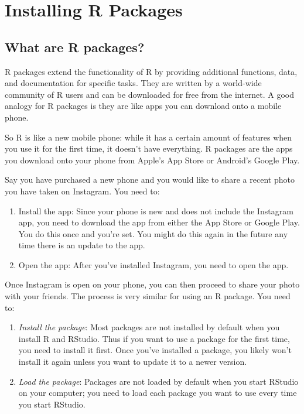 \documentclass[]{book}
\providecommand{\tightlist}{%
  \setlength{\itemsep}{0pt}\setlength{\parskip}{0pt}}
\begin{document}
\hypertarget{installing-r-packages}{%
\chapter{Installing R Packages}\label{installing-r-packages}}

\hypertarget{what-are-r-packages}{%
\section{What are R packages?}\label{what-are-r-packages}}

R packages extend the functionality of R by providing additional functions, data, and documentation for specific tasks. They are written by a world-wide community of R users and can be downloaded for free from the internet. A good analogy for R packages is they are like apps you can download onto a mobile phone.

So R is like a new mobile phone: while it has a certain amount of features when you use it for the first time, it doesn't have everything. R packages are the apps you download onto your phone from Apple's App Store or Android's Google Play.

Say you have purchased a new phone and you would like to share a recent photo you have taken on Instagram. You need to:

\begin{enumerate}
\def\labelenumi{\arabic{enumi}.}
\item
  Install the app: Since your phone is new and does not include the Instagram app, you need to download the app from either the App Store or Google Play. You do this once and you're set. You might do this again in the future any time there is an update to the app.
\item
  Open the app: After you've installed Instagram, you need to open the app.
\end{enumerate}

Once Instagram is open on your phone, you can then proceed to share your photo with your friends. The process is very similar for using an R package. You need to:

\begin{enumerate}
\def\labelenumi{\arabic{enumi}.}
\tightlist
\item
  \emph{Install the package}: Most packages are not installed by default when you install R and RStudio. Thus if you want to use a package for the first time, you need to install it first. Once you've installed a package, you likely won't install it again unless you want to update it to a newer version.\\
\item
  \emph{Load the package}: Packages are not loaded by default when you start RStudio on your computer; you need to load each package you want to use every time you start RStudio.
\end{enumerate}
\end{document}
